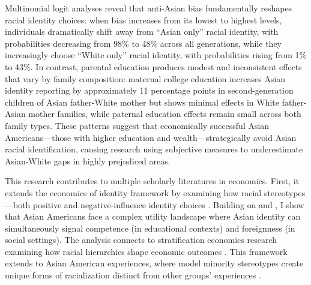 Multinomial logit analyses reveal that anti-Asian bias fundamentally reshapes racial identity choices: when bias increases from its lowest to highest levels, individuals dramatically shift away from ``Asian only'' racial identity, with probabilities decreasing from 98\% to 48\% across all generations, while they increasingly choose ``White only'' racial identity, with probabilities rising from 1\% to 43\%. In contrast, parental education produces modest and inconsistent effects that vary by family composition: maternal college education increases Asian identity reporting by approximately 11 percentage points in second-generation children of Asian father-White mother but shows minimal effects in White father-Asian mother families, while paternal education effects remain small across both family types. These patterns suggest that economically successful Asian Americans---those with higher education and wealth---strategically avoid Asian racial identification, causing research using subjective measures to underestimate Asian-White gaps in highly prejudiced areas.

This research contributes to multiple scholarly literatures in economics. First, it extends the economics of identity framework by examining how racial stereotypes—both positive and negative-influence identity choices \autocite{akerlofEconomicsIdentity2000}. Building on \textcite{charnessSocialIdentityGroup2020} and \textcite{atkinHowWeChoose2021}, I show that Asian Americans face a complex utility landscape where Asian identity can simultaneously signal competence (in educational contexts) and foreignness (in social settings). The analysis connects to stratification economics research examining how racial hierarchies shape economic outcomes \autocite{darityEconomicsIdentityOrigin2006,darityPositionPossessionsStratification2022}. This framework extends to Asian American experiences, where model minority stereotypes create unique forms of racialization distinct from other groups' experiences \autocite{goldsmithDarkLightSkin2007,hamiltonSheddingLightMarriage2009,dietteSkinShadeStratification2015}.

